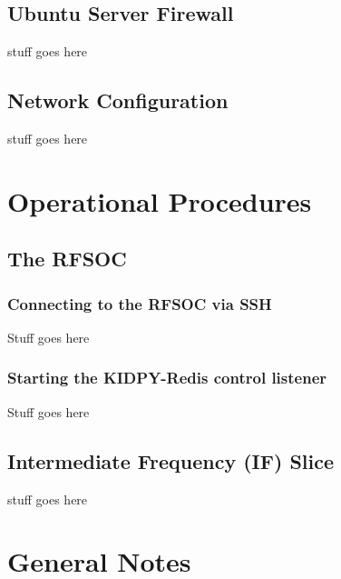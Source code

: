 \documentclass[11pt,letterpaper]{article}
\begin{document}
\subsection{Ubuntu Server Firewall}
stuff goes here
\subsection{Network Configuration}
stuff goes here


\newpage
\section{Operational Procedures}
\subsection{The RFSOC}
\subsubsection{Connecting to the RFSOC via SSH}
Stuff goes here
\subsubsection{Starting the KIDPY-Redis control listener}
Stuff goes here
\subsection{Intermediate Frequency (IF) Slice}
stuff goes here


\newpage
\section{General Notes}
\end{document}
